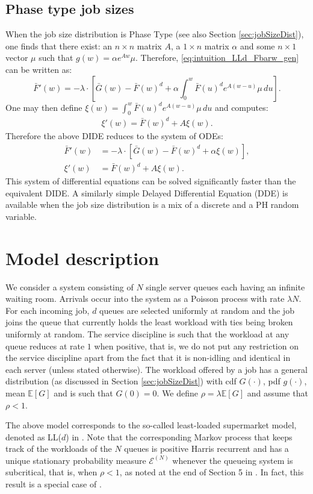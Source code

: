 \documentclass[12pt]{report}
\newcommand{\E}{\mathbb{E}}
\begin{document}
\subsection{Phase type job sizes}
When the job size distribution is Phase Type (see also Section \ref{sec:jobSizeDist}), one finds that there exist: an $n \times n$ matrix $A$, a $1 \times n$ matrix $\alpha$ and some $n \times 1$ vector $\mu$ such that $g(w) = \alpha e^{Aw} \mu$. Therefore, \eqref{eq:intuition_LLd_Fbarw_gen} can be written as:
$$
\bar F'(w) = - \lambda \cdot \left[ \bar G(w) - \bar F(w)^d + \alpha \int_0^w \bar F(u)^d e^{A(w-u)} \mu \, du \right].
$$
One may then define $\xi(w) = \int_0^w \bar F(u)^d e^{A(w-u)} \mu \, du$ and computes:
\begin{align*}
\xi'(w) = \bar F(w)^d + A \xi(w).
\end{align*}
Therefore the above DIDE reduces to the system of ODEs:
\begin{align*}
\bar F'(w) &= - \lambda \cdot \left[ \bar G(w) - \bar F(w)^d + \alpha \xi(w) \right],\\
\xi'(w) &= \bar F(w)^d + A \xi(w).
\end{align*}
This system of differential equations can be solved significantly faster than the equivalent DIDE. A similarly simple Delayed Differential Equation (DDE) is available when the job size distribution is a mix of a discrete and a PH random variable.

\section{Model description}\label{sec:model_LLd}
We consider a system consisting of $N$ single server queues each having an infinite waiting room. Arrivals occur into the system as a Poisson process with rate $\lambda N$. For each incoming job, 
$d$ queues are selected uniformly at random and the job joins the queue that currently holds the least 
workload with ties being broken uniformly at random. The service discipline is such that the workload
at any queue reduces at rate $1$ when positive, that is, we do not put any restriction on the service discipline apart
from the fact that it is non-idling and identical in each server (unless stated otherwise). 
The workload offered by a job has a general distribution (as discussed in Section \ref{sec:jobSizeDist}) with cdf $G(\cdot)$, pdf $g(\cdot)$, 
mean $\E[G]$ and is such that $G(0)=0$. We define $\rho = \lambda \E[G]$ and assume that $\rho < 1$.

The above model corresponds to the so-called least-loaded supermarket model, denoted as LL($d$) in \cite{bramsonLB, bramson2012asymptotic}.
Note that the corresponding Markov process that keeps track of the workloads of the $N$ queues is positive Harris recurrent and has a 
unique stationary probability measure $\mathcal{E}^{(N)}$ whenever the queueing system is subcritical, that is, when $\rho  < 1$, as noted at 
the end of Section 5 in \cite{bramson2011}. In fact, this result is a special case of \cite[Theorem 2.5]{Foss98}.  
 
\end{document}
